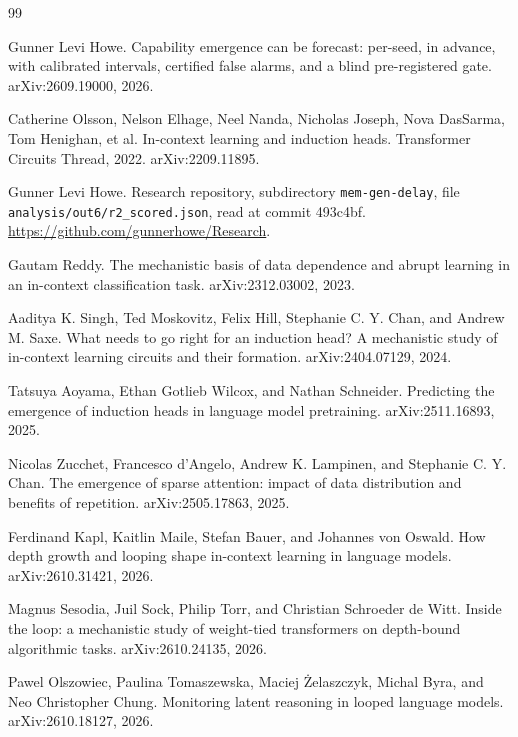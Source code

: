 \documentclass[10pt]{article}
\begin{document}
\begin{thebibliography}{99}
\small
\raggedright
\setlength{\itemsep}{1pt}
\setlength{\parsep}{0pt}

Gunner Levi Howe.
\newblock Capability emergence can be forecast: per-seed, in advance, with calibrated intervals, certified false alarms, and a blind pre-registered gate.
\newblock arXiv:2609.19000, 2026.

Catherine Olsson, Nelson Elhage, Neel Nanda, Nicholas Joseph, Nova DasSarma, Tom Henighan, et al.
\newblock In-context learning and induction heads.
\newblock Transformer Circuits Thread, 2022. arXiv:2209.11895.

Gunner Levi Howe.
\newblock Research repository, subdirectory \texttt{mem-gen-delay}, file \texttt{analysis/out6/r2\_scored.json}, read at commit 493c4bf.
\newblock \url{https://github.com/gunnerhowe/Research}.

Gautam Reddy.
\newblock The mechanistic basis of data dependence and abrupt learning in an in-context classification task.
\newblock arXiv:2312.03002, 2023.

Aaditya K. Singh, Ted Moskovitz, Felix Hill, Stephanie C. Y. Chan, and Andrew M. Saxe.
\newblock What needs to go right for an induction head? A mechanistic study of in-context learning circuits and their formation.
\newblock arXiv:2404.07129, 2024.

Tatsuya Aoyama, Ethan Gotlieb Wilcox, and Nathan Schneider.
\newblock Predicting the emergence of induction heads in language model pretraining.
\newblock arXiv:2511.16893, 2025.

Nicolas Zucchet, Francesco d'Angelo, Andrew K. Lampinen, and Stephanie C. Y. Chan.
\newblock The emergence of sparse attention: impact of data distribution and benefits of repetition.
\newblock arXiv:2505.17863, 2025.

Ferdinand Kapl, Kaitlin Maile, Stefan Bauer, and Johannes von Oswald.
\newblock How depth growth and looping shape in-context learning in language models.
\newblock arXiv:2610.31421, 2026.

Magnus Sesodia, Juil Sock, Philip Torr, and Christian Schroeder de Witt.
\newblock Inside the loop: a mechanistic study of weight-tied transformers on depth-bound algorithmic tasks.
\newblock arXiv:2610.24135, 2026.

Pawel Olszowiec, Paulina Tomaszewska, Maciej \.{Z}elaszczyk, Michal Byra, and Neo Christopher Chung.
\newblock Monitoring latent reasoning in looped language models.
\newblock arXiv:2610.18127, 2026.


\end{thebibliography}
\end{document}
